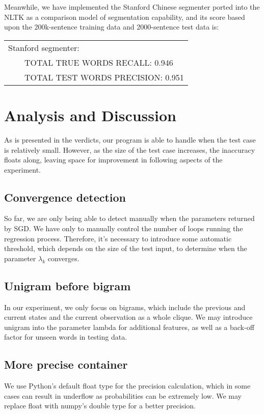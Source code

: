 \documentclass[UTF8,11pt]{article}
\begin{document}
Meanwhile, we have implemented the Stanford Chinese segmenter ported into the NLTK as a comparison model of segmentation capability, and its score based upon the 200k-sentence training data and 2000-sentence test data is:
\begin{center}
\begin{tabular}{ll}
Stanford segmenter: & \\
\multicolumn{2}{l}{~~~~TOTAL TRUE WORDS RECALL: 0.946} \\
\multicolumn{2}{l}{~~~~TOTAL TEST WORDS PRECISION: 0.951} \\
\end{tabular}
\end{center}

\section{Analysis and Discussion}
\noindent As is presented in the verdicts, our program is able to handle when the test case is relatively small. However, as the size of the test case increases, the inaccuracy floats along, leaving space for improvement in following aspects of the experiment.

\subsection{Convergence detection}
\noindent So far, we are only being able to detect manually when the parameters returned by SGD. We have only to manually control the number of loops running the regression process. Therefore, it's necessary to introduce some automatic threshold, which depends on the size of the test input, to determine when the parameter $\lambda_k$ converges.

\subsection{Unigram before bigram}
\noindent In our experiment, we only focus on bigrams, which include the previous and current states and the current observation as a whole clique. We may introduce unigram into the parameter lambda for additional features, as well as a back-off factor for unseen words in testing data.

\subsection{More precise container}
\noindent We use Python's default float type for the precision calculation, which in some cases can result in underflow as probabilities can be extremely low. We may replace float with numpy's double type for a better precision.
\end{document}
